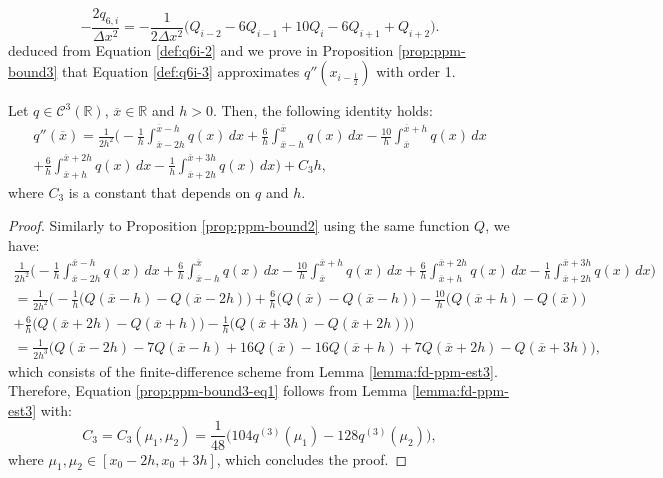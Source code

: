 \begin{equation}
	\label{def:q6i-3}
	-\frac{2q_{6,i}}{\Delta x^2} = 
	-\frac{1}{2\Delta x^2} \bigg( Q_{i-2} - 6Q_{i-1} + 10Q_{i} -6Q_{i+1}  + Q_{i+2} \bigg).
\end{equation}
deduced from Equation \eqref{def:q6i-2}
and we prove in Proposition \ref{prop:ppm-bound3} that Equation \eqref{def:q6i-3}
approximates $q''(x_{i-\frac{1}{2}})$ with order 1.
\begin{prop}
	\label{prop:ppm-bound3}
	Let $q \in \mathcal{C}^{3}(\mathbb{R})$, $\overline{x} \in \mathbb{R}$ and $h>0$.
	Then, the following identity holds:
	\begin{equation}
		\begin{split}
			\label{prop:ppm-bound3-eq1}
			q''(\overline{x} ) = \frac{1}{2h^2}
			\bigg(-\frac{1}{h} \int_{\overline{x}-2h}^{\overline{x}-h} q(x) \,dx 
			+\frac{6}{h}\int_{\overline{x}-h}^{\overline{x}} q(x) \,dx   
			-\frac{10}{h}\int_{\overline{x}}^{\overline{x}+h} q(x) \,dx  \\ 
			+\frac{6}{h} \int_{\overline{x}+h}^{\overline{x}+2h} q(x) \,dx   
			-\frac{1}{h} \int_{\overline{x}+2h}^{\overline{x}+3h} q(x) \,dx   
			\bigg) + C_3h,
		\end{split}
	\end{equation}
	where $C_3$ is a constant that depends on $q$ and $h$.
\end{prop}
\begin{proof}
	Similarly to Proposition \ref{prop:ppm-bound2} using the same function $Q$, we have:
	\begin{align*}
		\frac{1}{2h^2}
		\bigg(-\frac{1}{h} \int_{\overline{x}-2h}^{\overline{x}-h} q(x) \,dx 
		+\frac{6}{h}\int_{\overline{x}-h}^{\overline{x}} q(x) \,dx   
		-\frac{10}{h}\int_{\overline{x}}^{\overline{x}+h} q(x) \,dx  
		+\frac{6}{h} \int_{\overline{x}+h}^{\overline{x}+2h} q(x) \,dx   
		-\frac{1}{h} \int_{\overline{x}+2h}^{\overline{x}+3h} q(x) \,dx   
		\bigg)\\ 
		= \frac{1}{2h^2} \bigg(
		-\frac{1}{h}   \big( Q(\overline{x}-h)- Q(\overline{x}-2h)\big) 
		+\frac{6}{h} \big( Q(\overline{x}) - Q(\overline{x}-h) \big) 
		-\frac{10}{h} \big( Q(\overline{x}+h) - Q(\overline{x})  \big) \\
		+\frac{6}{h}  \big( Q(\overline{x}+2h) - Q(\overline{x}+h)  \big) 
		-\frac{1}{h}  \big( Q(\overline{x}+3h) - Q(\overline{x}+2h)  \big) 
		\bigg)\\
		= \frac{1}{2h^3}\bigg(Q(\overline{x}-2h) - 7Q(\overline{x}-h) + 16Q(\overline{x}) 
		-16Q(\overline{x}+h) +7Q(\overline{x}+2h) - Q(\overline{x}+3h)  \bigg),
	\end{align*}
	which consists of the finite-difference scheme from Lemma \ref{lemma:fd-ppm-est3}. 
	Therefore, Equation \eqref{prop:ppm-bound3-eq1} follows from 
	Lemma \ref{lemma:fd-ppm-est3} with:
	\begin{equation}
		\label{prop:ppm-bound3-eq2}
		C_3 = C_3(\mu_1,\mu_{2}) = \frac{1}{48}\bigg(104q^{(3)}(\mu_{1}) - 128q^{(3)}(\mu_{2}) \bigg), 
	\end{equation}
	where $\mu_{1}, \mu_{2} \in [x_0-2h,x_0+3h]$, which concludes the proof.
\end{proof}
